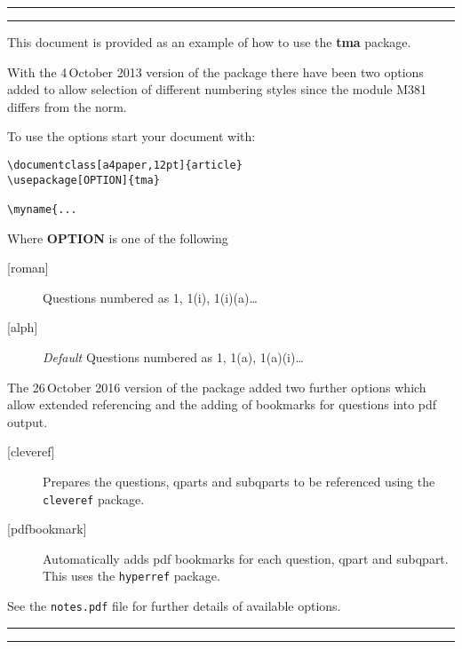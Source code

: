 \documentclass[a4paper,12pt]{article}
\begin{document}
\hfill{}

\rule[0.4pt-1em]{0.4pt}{1em}\hrulefill\rule[0.4pt-1em]{0.4pt}{1em}

\begin{center}
\begin{minipage}{0.9\linewidth}
This document is provided as an example of how to use the \textbf{tma} package.

With the 4\nth\,October 2013 version of the package there have been two options added to allow selection of
different numbering styles since the module M381 differs from the norm.

To use the options start your document with:
\begin{verbatim}
\documentclass[a4paper,12pt]{article}
\usepackage[OPTION]{tma}

\myname{...
\end{verbatim}

Where \textbf{OPTION} is one of the following
\begin{description}
  \item[{[}roman{]}] Questions numbered as 1, 1(i), 1(i)(a)\dots
  \item[{[}alph{]}] \emph{Default} Questions numbered as 1, 1(a), 1(a)(i)\dots
\end{description}

The 26\nth\,October 2016 version of the package added two further options which allow extended referencing and the adding of 
bookmarks for questions into pdf output.

\begin{description}
  \item[{[}cleveref{]}] Prepares the questions, qparts and subqparts to be referenced using the \verb|cleveref| package.
  \item[{[}pdfbookmark{]}] Automatically adds pdf bookmarks for each question, qpart and subqpart. This uses the \verb|hyperref| package.
\end{description}

See the \verb|notes.pdf| file for further details of available options.

\end{minipage}
\end{center}

\rule{0.4pt}{1em}\hrulefill\rule{0.4pt}{1em}
\end{document}
